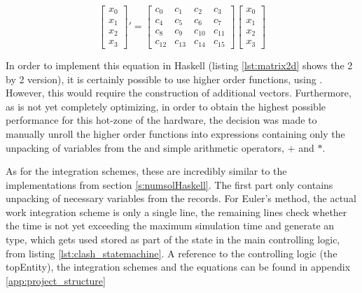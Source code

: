 \begin{equation}
\label{eq:testeq}
\begin{bmatrix} x_{0} \\ x_{1} \\ x_{2} \\ x_{3} \end{bmatrix}' 
= 
\begin{bmatrix} 
c_{0} & c_{1} & c_{2} & c_{3} \\ 
c_{4} & c_{5} & c_{6} & c_{7} \\
c_{8} & c_{9} & c_{10} & c_{11} \\
c_{12} & c_{13} & c_{14} & c_{15}
\end{bmatrix} 
\begin{bmatrix} x_{0} \\ x_{1} \\ x_{2} \\ x_{3} \end{bmatrix}
\end{equation}

In order to implement this equation in Haskell (listing \ref{lst:matrix2d} shows the 2 by 2 version), it is certainly possible to use higher order functions, using . However, this would require the construction of additional vectors. Furthermore, as \clash{} is not yet completely optimizing, in order to obtain the highest possible performance for this hot-zone of the hardware, the decision was made to manually unroll the higher order functions into expressions containing only the unpacking of variables from the  and simple arithmetic operators, $+$ and $*$. 



As for the integration schemes, these are incredibly similar to the implementations from section \ref{s:numsolHaskell}. The first part only contains unpacking of necessary variables from the records. For Euler's method, the actual work integration scheme is only a single line, the remaining lines check whether the time is not yet exceeding the maximum simulation time and generate an  type, which gets used stored as part of the state in the main controlling logic, from listing \ref{lst:clash_statemachine}. A reference to the controlling logic (the topEntity), the integration schemes and the equations can be found in appendix \ref{app:project_structure}

